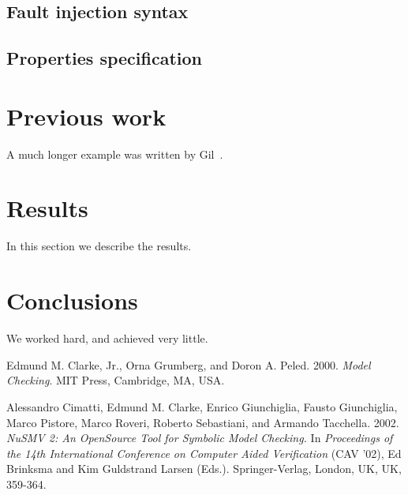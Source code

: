 \documentclass[12pt]{article}
\begin{document}
\subsection{Fault injection syntax}
\subsection{Properties specification}



\section{Previous work}\label{previous work}
A much longer \LaTeXe{} example was written by Gil~\cite{Gil:02}.

\section{Results}\label{results}
In this section we describe the results.

\section{Conclusions}\label{conclusions}
We worked hard, and achieved very little.

%
%
\begin{thebibliography}{9}

    Edmund M. Clarke, Jr., Orna Grumberg, and Doron A. Peled. 2000.
    \emph{Model Checking}. MIT Press, Cambridge, MA, USA. 

    Alessandro Cimatti, Edmund M. Clarke, Enrico Giunchiglia, Fausto
    Giunchiglia, Marco Pistore, Marco Roveri, Roberto Sebastiani, and Armando
    Tacchella. 2002. \emph{NuSMV 2: An OpenSource Tool for Symbolic Model
    Checking.} In \emph{Proceedings of the 14th International Conference on
    Computer Aided Verification} (CAV '02), Ed Brinksma and Kim Guldstrand
    Larsen (Eds.). Springer-Verlag, London, UK, UK, 359-364. 

\end{thebibliography}
\end{document}

